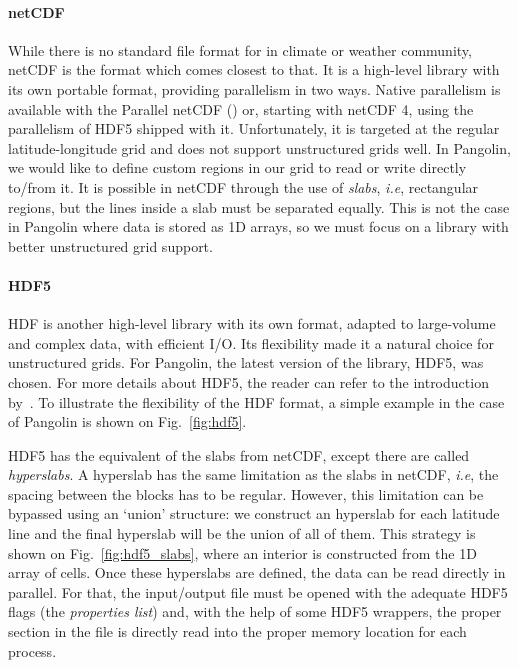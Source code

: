 \paragraph{netCDF}
While there is no standard file format for in climate or weather community,
\gls{netCDF} is the format which comes closest to that. It is a high-level
library with its own portable format, providing parallelism in two ways. Native
parallelism is available with the Parallel netCDF (\cite{Li2003}) or, starting
with netCDF 4, using the parallelism of HDF5 shipped with it. Unfortunately, it
is targeted at the regular latitude-longitude grid and does not support 
unstructured grids well. In Pangolin, we would like to define custom regions in our
grid to read or write directly to/from it. It is possible in netCDF through the
use of \textit{slabs}, \textit{i.e}, rectangular regions, but the lines inside a slab
must be separated equally. This is not the case in Pangolin where data is stored
as 1D arrays, so we must
focus on a library with better unstructured grid support.

\paragraph{HDF5}
\gls{HDF} is another high-level library with its own format, adapted to
large-volume and complex data, with efficient I/O. Its flexibility made it a
natural choice for unstructured grids. For Pangolin, the latest version of the
library, HDF5, was chosen. For more details about HDF5, the reader can refer to
the introduction by~\cite{Folk2011}. To illustrate the flexibility of the HDF
format, a simple example in the case of Pangolin is shown on Fig.~\ref{fig:hdf5}.

HDF5 has the equivalent of the slabs from netCDF, except there are called
\textit{hyperslabs}. A hyperslab has the same limitation as the slabs in netCDF,
\textit{i.e}, the spacing between the blocks has to be regular. However, this limitation can be
bypassed using an `union' structure: we construct an hyperslab for each latitude
line and the final hyperslab will be the union of all of them.  This strategy is
shown on Fig.~\ref{fig:hdf5_slabs}, where an interior is constructed from the 1D
array of cells. Once these hyperslabs are defined, the data can be read directly
in parallel. For that, the input/output file must be opened with the adequate
HDF5 flags (the \textit{properties list}) and, with the help of some HDF5
wrappers, the proper section in the file is directly read into the proper memory
location for each process.

